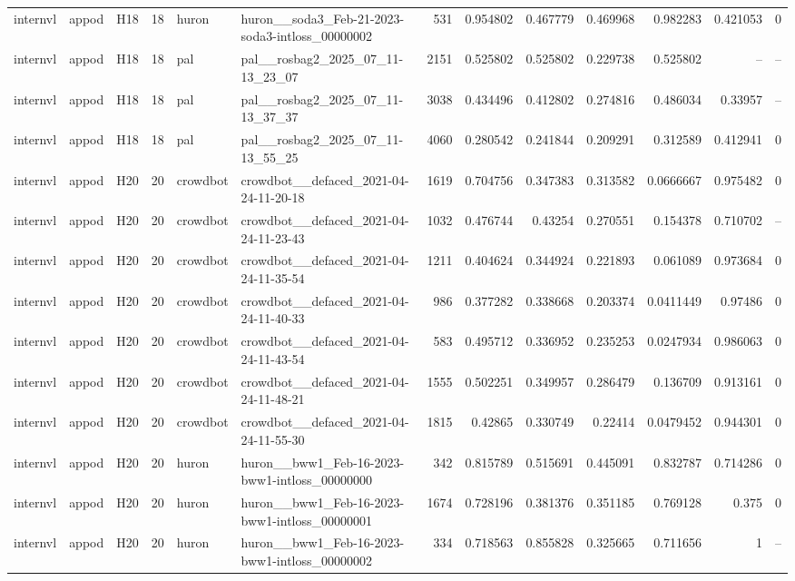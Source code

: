\begin{longtable}{lllrllrrrrrrr}
internvl & appod & H18 & 18 & huron & huron\_\_soda3\_Feb-21-2023-soda3-intloss\_00000002 & 531 & 0.954802 & 0.467779 & 0.469968 & 0.982283 & 0.421053 & 0 \\
internvl & appod & H18 & 18 & pal & pal\_\_rosbag2\_2025\_07\_11-13\_23\_07 & 2151 & 0.525802 & 0.525802 & 0.229738 & 0.525802 & -- & -- \\
internvl & appod & H18 & 18 & pal & pal\_\_rosbag2\_2025\_07\_11-13\_37\_37 & 3038 & 0.434496 & 0.412802 & 0.274816 & 0.486034 & 0.33957 & -- \\
internvl & appod & H18 & 18 & pal & pal\_\_rosbag2\_2025\_07\_11-13\_55\_25 & 4060 & 0.280542 & 0.241844 & 0.209291 & 0.312589 & 0.412941 & 0 \\
internvl & appod & H20 & 20 & crowdbot & crowdbot\_\_defaced\_2021-04-24-11-20-18 & 1619 & 0.704756 & 0.347383 & 0.313582 & 0.0666667 & 0.975482 & 0 \\
internvl & appod & H20 & 20 & crowdbot & crowdbot\_\_defaced\_2021-04-24-11-23-43 & 1032 & 0.476744 & 0.43254 & 0.270551 & 0.154378 & 0.710702 & -- \\
internvl & appod & H20 & 20 & crowdbot & crowdbot\_\_defaced\_2021-04-24-11-35-54 & 1211 & 0.404624 & 0.344924 & 0.221893 & 0.061089 & 0.973684 & 0 \\
internvl & appod & H20 & 20 & crowdbot & crowdbot\_\_defaced\_2021-04-24-11-40-33 & 986 & 0.377282 & 0.338668 & 0.203374 & 0.0411449 & 0.97486 & 0 \\
internvl & appod & H20 & 20 & crowdbot & crowdbot\_\_defaced\_2021-04-24-11-43-54 & 583 & 0.495712 & 0.336952 & 0.235253 & 0.0247934 & 0.986063 & 0 \\
internvl & appod & H20 & 20 & crowdbot & crowdbot\_\_defaced\_2021-04-24-11-48-21 & 1555 & 0.502251 & 0.349957 & 0.286479 & 0.136709 & 0.913161 & 0 \\
internvl & appod & H20 & 20 & crowdbot & crowdbot\_\_defaced\_2021-04-24-11-55-30 & 1815 & 0.42865 & 0.330749 & 0.22414 & 0.0479452 & 0.944301 & 0 \\
internvl & appod & H20 & 20 & huron & huron\_\_bww1\_Feb-16-2023-bww1-intloss\_00000000 & 342 & 0.815789 & 0.515691 & 0.445091 & 0.832787 & 0.714286 & 0 \\
internvl & appod & H20 & 20 & huron & huron\_\_bww1\_Feb-16-2023-bww1-intloss\_00000001 & 1674 & 0.728196 & 0.381376 & 0.351185 & 0.769128 & 0.375 & 0 \\
internvl & appod & H20 & 20 & huron & huron\_\_bww1\_Feb-16-2023-bww1-intloss\_00000002 & 334 & 0.718563 & 0.855828 & 0.325665 & 0.711656 & 1 & -- \\

\end{longtable}
